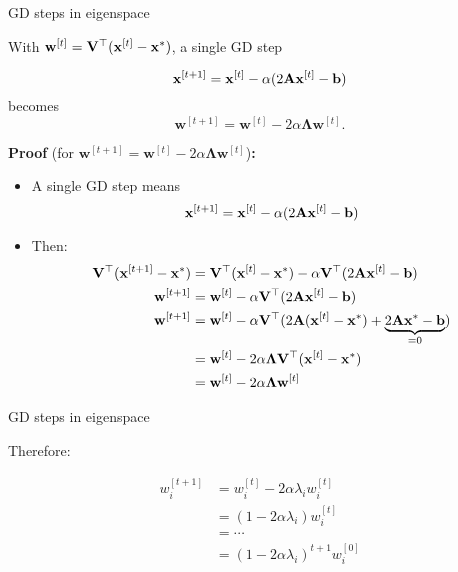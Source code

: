 \documentclass[11pt,compress,t,notes=noshow, xcolor=table]{beamer}
\begin{document}
\begin{vbframe}{GD steps in eigenspace}

With $\mathbf{w}^{[t]} = \mathbf{V}^\top (\mathbf{x}^{[t]} - \mathbf{x}^\ast)$, a single GD step

\begin{equation*}
    \mathbf{x}^{[t + 1]} = \mathbf{x}^{[t]} - \alpha (2 \mathbf{A} \mathbf{x}^{[t]} - \mathbf{b})
\end{equation*}
becomes
\begin{equation*}
    \mathbf{w}^{[t+1]} = \mathbf{w}^{[t]} - 2 \alpha \bm{\Lambda} \mathbf{w}^{[t]}.
\end{equation*}

\framebreak

\textbf{Proof} (for $\mathbf{w}^{[t+1]} = \mathbf{w}^{[t]} - 2 \alpha \bm{\Lambda} \mathbf{w}^{[t]}$)\textbf{:}

\begin{itemize}
    \item A single GD step means
        \begin{equation*}
            \mathbf{x}^{[t+1]} = \mathbf{x}^{[t]} - \alpha (2 \mathbf{A} \mathbf{x}^{[t]} - \mathbf{b})
        \end{equation*}
    \item Then:
        \begin{align*}
            \mathbf{V}^\top (\mathbf{x}^{[t+1]} - \mathbf{x}^\ast) &= \mathbf{V}^\top (\mathbf{x}^{[t]} - \mathbf{x}^\ast) - \alpha \mathbf{V}^\top (2 \mathbf{A} \mathbf{x}^{[t]} - \mathbf{b}) \\
            \mathbf{w}^{[t+1]} &= \mathbf{w}^{[t]} - \alpha \mathbf{V}^\top (2 \mathbf{A} \mathbf{x}^{[t]} - \mathbf{b}) \\
            \mathbf{w}^{[t+1]} &= \mathbf{w}^{[t]} - \alpha \mathbf{V}^\top (2 \mathbf{A} (\mathbf{x}^{[t]} - \mathbf{x}^\ast) + \underbrace{2 \mathbf{A} \mathbf{x}^\ast - \mathbf{b}}_{=0}) \\
            &= \mathbf{w}^{[t]} - 2 \alpha \bm{\Lambda} \mathbf{V}^\top (\mathbf{x}^{[t]} - \mathbf{x}^\ast) \\
            &= \mathbf{w}^{[t]} - 2 \alpha \bm{\Lambda} \mathbf{w}^{[t]}
        \end{align*}
\end{itemize}
\end{vbframe}

\begin{vbframe}{GD steps in eigenspace}

Therefore:

\vspace{-\baselineskip}

\begin{align*}
    w_i^{[t+1]} &= w_i^{[t]} - 2 \alpha \lambda_i w_i^{[t]} \\
    &= (1 - 2 \alpha \lambda_i) w_i^{[t]} \\
    &= \cdots \\
    &= (1 - 2 \alpha \lambda_i)^{t+1} w_i^{[0]}
\end{align*}

\framebreak

\end{vbframe}
\end{document}
